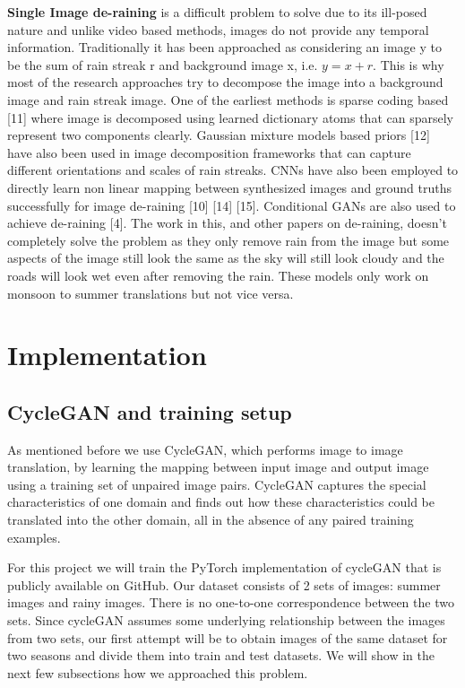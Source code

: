 \documentclass{article}
\begin{document}
\textbf{Single Image de-raining} is a difficult problem to solve due to its ill-posed nature and unlike video based methods, images do not provide any temporal information. Traditionally it has been approached as considering an image y to be the sum of rain streak r and background image x, i.e. $y = x + r$. This is why most of the research approaches try to decompose the image into a background image and rain streak image. One of the earliest methods is sparse coding based [11] where image is decomposed using learned dictionary atoms that can sparsely represent two components clearly. Gaussian mixture models based priors [12] have also been used in image decomposition frameworks that can capture different orientations and scales of rain streaks. CNNs have also been employed to directly learn non linear mapping between synthesized images and ground truths successfully for image de-raining [10] [14] [15]. Conditional GANs are also used to achieve de-raining [4]. The work in this, and other papers on de-raining, doesn’t completely solve the problem as they only remove rain from the image but some aspects of the image still look the same as the sky will still look cloudy and the roads will look wet even after removing the rain. These models only work on monsoon to summer translations but not vice versa.

\section{Implementation}
\label{implementation}

\subsection{CycleGAN and training setup}

As mentioned before we use CycleGAN, which performs image to image  translation, by learning the mapping between input image and output image using a training set of unpaired image pairs. CycleGAN captures the special characteristics of one domain and finds out how these characteristics could be translated into the other domain, all in the absence of any paired training examples.

For this project we will train the PyTorch implementation of cycleGAN that is publicly available on GitHub. Our dataset consists of 2 sets of images: summer images and rainy images. There is no one-to-one correspondence between the two sets. Since cycleGAN assumes some underlying relationship between the images from two sets, our first attempt will be to obtain images of the same dataset for two seasons and divide them into train and test datasets. We will show in the next few subsections how we approached this problem.
\end{document}
